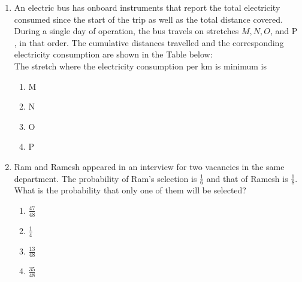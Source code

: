 \documentclass[journal]{IEEEtran}
\begin{document}
\begin{enumerate}
\section*{Misogynous}
\begin{multicols}{4}
    \begin{enumerate}
        \item   Misogynousness
        \item Misogynity
        \item  Misogynously
        \item Misogynous
    \end{enumerate}
\end{multicols}
\item An electric bus has onboard instruments that report the total electricity consumed since the start of the trip as well as the total distance covered. During a single day of operation, the bus travels on stretches ${M}, {N}, {O}$, and P , in that order. The cumulative distances travelled and the corresponding electricity consumption are shown in the Table below:
    \\
    The stretch where the electricity consumption per km is minimum is
\begin{multicols}{4}
    \begin{enumerate}
        \item M
        \item N
        \item O
        \item P
    \end{enumerate}
\end{multicols}
  
  \item Ram and Ramesh appeared in an interview for two vacancies in the same department. The probability of Ram's selection is $\frac{1} { 6}$ and that of Ramesh is $\frac{1} { 8}$. What is the probability that only one of them will be selected?
  \begin{multicols}{4}
			\begin{enumerate}
   \item $\frac{47}{48}$
\item $\frac{1}{4}$
\item $\frac{13}{48}$
\item  $\frac{35}{48}$
\end{enumerate}
		\end{multicols}
   

\end{enumerate}
\end{document}
